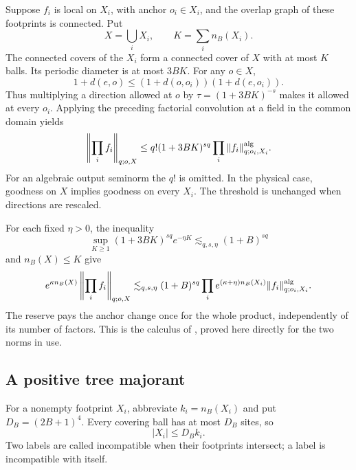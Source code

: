 \documentclass[11pt,reqno]{amsart}
\numberwithin{equation}{section}
\theoremstyle{definition}
\theoremstyle{remark}
\begin{document}
Suppose \(f_i\) is local on \(X_i\), with anchor
\(o_i\in X_i\), and the overlap graph of these
footprints is connected. Put
\[
                X=\bigcup_iX_i,\qquad
                K=\sum_i n_B(X_i).
\]
The connected covers of the \(X_i\) form a connected
cover of \(X\) with at most \(K\) balls. Its periodic
diameter is at most \(3BK\).
For any \(o\in X\),
\[
 1+d(e,o)\le
             (1+d(o,o_i))(1+d(e,o_i)).
\]
Thus multiplying a direction allowed at \(o\) by
\(\tau=(1+3BK)^{-s}\) makes it allowed at every \(o_i\).
Applying the preceding factorial convolution at a
field in the common domain yields
\begin{equation}
 \left\|\prod_i f_i\right\|_{q;o,X}
       \le q!(1+3BK)^{sq}
                         \prod_i\|f_i\|^{\rm alg}_{q;o_i,X_i}.
 \label{eq:connected-whole-product}
\end{equation}
For an algebraic output seminorm the \(q!\) is
omitted. In the physical case, goodness on \(X\)
implies goodness on every \(X_i\).
The threshold is unchanged when directions are
rescaled.

For each fixed \(\eta>0\), the inequality
\[
        \sup_{K\ge1}(1+3BK)^{sq}e^{-\eta K}
                            \lesssim_{q,s,\eta}(1+B)^{sq}
\]
and \(n_B(X)\le K\) give
\begin{equation}
 e^{\kappa n_B(X)}
       \left\|\prod_i f_i\right\|_{q;o,X}
 \lesssim_{q,s,\eta}(1+B)^{sq}
       \prod_i e^{(\kappa+\eta)n_B(X_i)}
                         \|f_i\|^{\rm alg}_{q;o_i,X_i}.
 \label{eq:connected-one-reserve}
\end{equation}
The reserve pays the anchor change once for the
whole product, independently of its number of
factors. This is the calculus of
\cite[Lemmas~8.2--8.3, pp.~29--30]{Main},
proved here directly for the two norms in use.

\subsection{A positive tree majorant}

For a nonempty footprint \(X_i\), abbreviate
\(k_i=n_B(X_i)\) and put \(D_B=(2B+1)^4\).
Every covering ball has at most \(D_B\) sites, so
\begin{equation}
                         |X_i|\le D_B k_i .
 \label{eq:connected-cover-cardinality}
\end{equation}
Two labels are called incompatible when their
footprints intersect; a label is incompatible
with itself.
\end{document}
